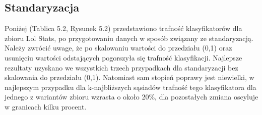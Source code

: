 \documentclass[oneside]{book}
\begin{document}
\subsection{Standaryzacja}


Poniżej (Tablica 5.2, Rysunek 5.2) przedstawiono 
trafność klasyfikatorów dla zbioru Lol Stats, 
po przygotowaniu danych w sposób związany ze standaryzacją.
Należy zwrócić uwage, że po skalowaniu wartości do przedziału
(0,1) oraz usunięciu wartości odstających pogorszyła się trafność
klasyfikacji. Najlepsze rezultaty uzyskano we wszystkich trzech
przypadkach dla standaryzacji bez skalowania do przedziału (0,1). 
Natomiast sam stopień poprawy jest niewielki, w najlepszym przypadku dla 
k-najbliższych sąsiadów trafność tego klasyfikatora dla jednego z wariantów zbioru
wzrasta o około 20\%, dla pozostałych zmiana oscyluje w granicach kilku procent.
\end{document}
